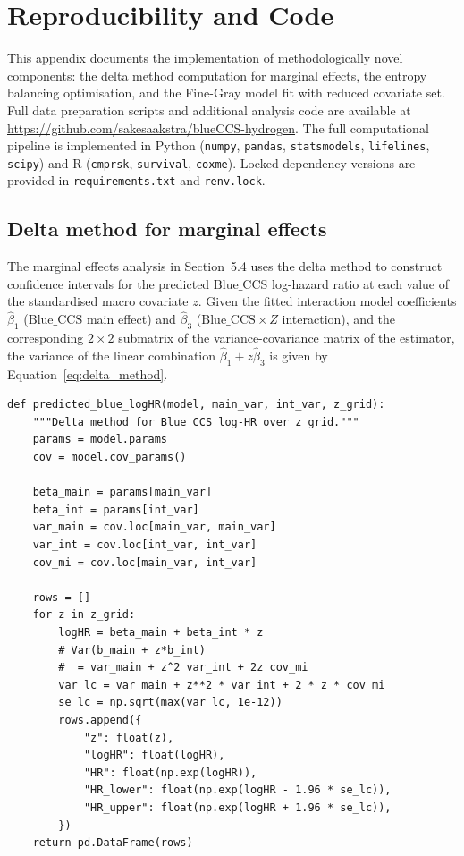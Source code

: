 \documentclass[11pt,a4paper]{article}
\newcommand{\BlueCCS}{\mathrm{Blue\_CCS}}
\begin{document}
\appendix

\section{Reproducibility and Code}

This appendix documents the implementation of methodologically novel components: the delta method computation for marginal effects, the entropy balancing optimisation, and the Fine-Gray model fit with reduced covariate set. Full data preparation scripts and additional analysis code are available at \url{https://github.com/sakesaakstra/blueCCS-hydrogen}. The full computational pipeline is implemented in Python (\texttt{numpy}, \texttt{pandas}, \texttt{statsmodels}, \texttt{lifelines}, \texttt{scipy}) and R (\texttt{cmprsk}, \texttt{survival}, \texttt{coxme}). Locked dependency versions are provided in \texttt{requirements.txt} and \texttt{renv.lock}.

\subsection{Delta method for marginal effects}

The marginal effects analysis in Section~5.4 uses the delta method to construct confidence intervals for the predicted $\BlueCCS$ log-hazard ratio at each value of the standardised macro covariate $z$. Given the fitted interaction model coefficients $\hat\beta_1$ ($\BlueCCS$ main effect) and $\hat\beta_3$ ($\BlueCCS \times Z$ interaction), and the corresponding $2 \times 2$ submatrix of the variance-covariance matrix of the estimator, the variance of the linear combination $\hat\beta_1 + z\hat\beta_3$ is given by Equation~\ref{eq:delta_method}.

\begin{lstlisting}[style=python, caption={Delta method implementation for marginal effects.}, label={lst:delta}]
def predicted_blue_logHR(model, main_var, int_var, z_grid):
    """Delta method for Blue_CCS log-HR over z grid."""
    params = model.params
    cov = model.cov_params()

    beta_main = params[main_var]
    beta_int = params[int_var]
    var_main = cov.loc[main_var, main_var]
    var_int = cov.loc[int_var, int_var]
    cov_mi = cov.loc[main_var, int_var]

    rows = []
    for z in z_grid:
        logHR = beta_main + beta_int * z
        # Var(b_main + z*b_int)
        #  = var_main + z^2 var_int + 2z cov_mi
        var_lc = var_main + z**2 * var_int + 2 * z * cov_mi
        se_lc = np.sqrt(max(var_lc, 1e-12))
        rows.append({
            "z": float(z),
            "logHR": float(logHR),
            "HR": float(np.exp(logHR)),
            "HR_lower": float(np.exp(logHR - 1.96 * se_lc)),
            "HR_upper": float(np.exp(logHR + 1.96 * se_lc)),
        })
    return pd.DataFrame(rows)
\end{lstlisting}
\end{document}
